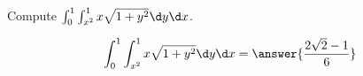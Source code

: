 \documentclass{ximera}
\author{David Guichard \and Neal Koblitz \and H. Jerome Keisler \and Albert Scheller \and Barry Balof \and Mike Wills \and Matthew Carr}
\begin{document}
\begin{exercise}




Compute $\int_{0}^{1}\int_{x^2}^{1}x\sqrt{1+y^2}\d y\d x$.
\begin{prompt}
\[
\int_{0}^{1}\int_{x^2}^{1}x\sqrt{1+y^2}\d y\d x=\answer{\frac{2\sqrt{2}-1}{6}}
\]
\end{prompt}



\end{exercise}
\end{document}
